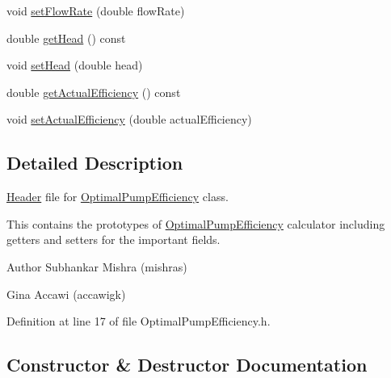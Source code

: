 \begin{DoxyCompactItemize}
void \hyperlink{class_optimal_pump_efficiency_a90067b57c559fd3274fb8d6e00f6221d}{set\+Flow\+Rate} (double flow\+Rate)
\item 
double \hyperlink{class_optimal_pump_efficiency_af31fdb10aabc197ff7536c9bbe006573}{get\+Head} () const
\item 
void \hyperlink{class_optimal_pump_efficiency_ac317c900ec68797cf051977147ea33da}{set\+Head} (double head)
\item 
double \hyperlink{class_optimal_pump_efficiency_aa2ac8a7c61bc28f82e30cb44b9c21008}{get\+Actual\+Efficiency} () const
\item 
void \hyperlink{class_optimal_pump_efficiency_a539b20c53c7ba6a5983a60d74be4ac9e}{set\+Actual\+Efficiency} (double actual\+Efficiency)
\end{DoxyCompactItemize}


\subsection{Detailed Description}
\hyperlink{class_header}{Header} file for \hyperlink{class_optimal_pump_efficiency}{Optimal\+Pump\+Efficiency} class. 

This contains the prototypes of \hyperlink{class_optimal_pump_efficiency}{Optimal\+Pump\+Efficiency} calculator including getters and setters for the important fields.

\begin{DoxyAuthor}{Author}
Subhankar Mishra (mishras) 

Gina Accawi (accawigk) 
\end{DoxyAuthor}


Definition at line 17 of file Optimal\+Pump\+Efficiency.\+h.



\subsection{Constructor \& Destructor Documentation}
\mbox{\label{class_optimal_pump_efficiency_ae07626ea079ff810ac6518d54c52b24a}} 
